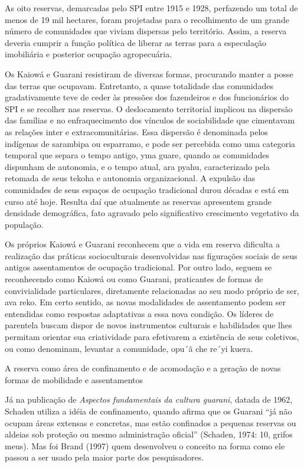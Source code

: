 As oito reservas, demarcadas pelo SPI entre 1915 e 1928, perfazendo um
total de menos de 19 mil hectares, foram projetadas para o recolhimento
de um grande número de comunidades que viviam dispersas pelo
território. Assim, a reserva deveria cumprir a função política de
liberar as terras para a especulação imobiliária e posterior ocupação
agropecuária. 

Os Kaiowá e Guarani resistiram de diversas formas, procurando manter a
posse das terras que ocupavam. Entretanto, a quase totalidade das
comunidades gradativamente teve de ceder às pressões dos fazendeiros e
dos funcionários do SPI e se recolher nas reservas. O deslocamento
territorial implicou na dispersão das famílias e no enfraquecimento dos
vínculos de sociabilidade que cimentavam as relações inter e
extracomunitárias. Essa dispersão é denominada pelos indígenas de
sarambipa ou esparramo, e pode ser percebida como uma categoria
temporal que separa o tempo antigo, yma guare, quando as comunidades
dispunham de autonomia, e o tempo atual, ara pyahu, caracterizado pela
retomada de seus tekoha e autonomia organizacional. A expulsão das
comunidades de seus espaços de ocupação tradicional durou décadas e
está em curso até hoje. Resulta daí que atualmente as reservas
apresentem grande densidade demográfica, fato agravado pelo
significativo crescimento vegetativo da população.

Os próprios Kaiowá e Guarani reconhecem que a vida em reserva dificulta
a realização das práticas socioculturais desenvolvidas nas figurações
sociais de seus antigos assentamentos de ocupação tradicional. Por
outro lado, seguem se reconhecendo como Kaiowá ou como Guarani,
praticantes de formas de convivialidade particulares, diretamente
relacionadas ao seu modo próprio de ser, ava reko. Em certo sentido, as
novas modalidades de assentamento podem ser entendidas como respostas
adaptativas a essa nova condição. Os líderes de parentela buscam dispor
de novos instrumentos culturais e habilidades que lhes permitam
orientar sua criatividade para efetivarem a existência de seus
coletivos, ou como denominam, levantar a comunidade, opu´ã che re´yi
kuera.

A reserva como área de confinamento e de acomodação e a geração de novas
formas de mobilidade e assentamentos

Já na publicação de \emph{Aspectos fundamentais da cultura guarani}, datada de
1962, Schaden utiliza a idéia de confinamento, quando afirma que os
Guarani ``já não ocupam áreas extensas e concretas, mas estão confinados
a pequenas reservas ou aldeias sob proteção ou mesmo administração
oficial'' (Schaden, 1974: 10, grifos meus). Mas foi Brand (1997) quem
desenvolveu o conceito na forma como ele passou a ser usado pela maior
parte dos pesquisadores.

